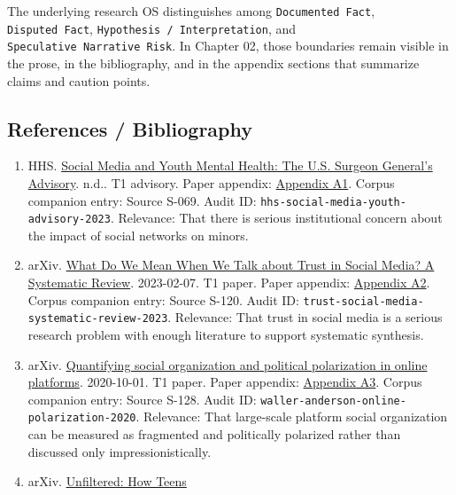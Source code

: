 \documentclass[
  american,
  11pt,
  letterpaper,
]{article}
\providecommand{\tightlist}{%
  \setlength{\itemsep}{0pt}\setlength{\parskip}{0pt}}
\begin{document}
The underlying research OS distinguishes among
\texttt{Documented\ Fact}, \texttt{Disputed\ Fact},
\texttt{Hypothesis\ /\ Interpretation}, and
\texttt{Speculative\ Narrative\ Risk}. In Chapter 02, those boundaries
remain visible in the prose, in the bibliography, and in the appendix
sections that summarize claims and caution points.

\subsection{References / Bibliography}\label{references-bibliography-2}

\begin{enumerate}
\def\labelenumi{\arabic{enumi}.}
\tightlist
\item
  HHS.
  \href{https://www.hhs.gov/surgeongeneral/priorities/youth-mental-health/social-media/index.html}{Social
  Media and Youth Mental Health: The U.S. Surgeon General's Advisory}.
  n.d.. T1 advisory. Paper appendix:
  \hyperref[ch-02-appendix-a1-social-media-and-youth-mental-health-the-u-s-surgeon-general-s-advisory]{Appendix
  A1}. Corpus companion entry: Source S-069. Audit ID:
  \texttt{hhs-social-media-youth-advisory-2023}. Relevance: That there
  is serious institutional concern about the impact of social networks
  on minors.
\item
  arXiv. \href{https://arxiv.org/abs/2302.03671}{What Do We Mean When We
  Talk about Trust in Social Media? A Systematic Review}. 2023-02-07. T1
  paper. Paper appendix:
  \hyperref[ch-02-appendix-a2-what-do-we-mean-when-we-talk-about-trust-in-social-media-a-systematic-review]{Appendix
  A2}. Corpus companion entry: Source S-120. Audit ID:
  \texttt{trust-social-media-systematic-review-2023}. Relevance: That
  trust in social media is a serious research problem with enough
  literature to support systematic synthesis.
\item
  arXiv. \href{https://arxiv.org/abs/2010.00590}{Quantifying social
  organization and political polarization in online platforms}.
  2020-10-01. T1 paper. Paper appendix:
  \hyperref[ch-02-appendix-a3-quantifying-social-organization-and-political-polarization-in-online-platforms]{Appendix
  A3}. Corpus companion entry: Source S-128. Audit ID:
  \texttt{waller-anderson-online-polarization-2020}. Relevance: That
  large-scale platform social organization can be measured as fragmented
  and politically polarized rather than discussed only
  impressionistically.
\item
  arXiv. \href{https://arxiv.org/abs/2504.02176}{Unfiltered: How Teens
}
\end{enumerate}
\end{document}
